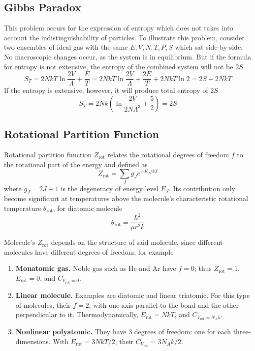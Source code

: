 \documentclass[../../../Main.tex]{subfiles}
\begin{document}
\subsection*{Gibbs Paradox}

This problem occurs for the expression of entropy which does not takes into account the indistinguishability of particles. To illustrate this problem, consider two ensembles of ideal gas with the same $E,V,N,T,P,S$ which sat side-by-side.  No macroscopic changes occur, as the system is in equilibrium. But if the formula for entropy is not extensive, the entropy of the combined system will not be $2S$
\begin{equation*}
	S_T=2NkT\ln\frac{2V}{\Lambda}+\frac{E}{T}=2NkT\ln\frac{2V}{\Lambda}+\frac{2E}{T}+2NkT\ln2=2S+2NkT
\end{equation*}
If the entropy is extensive, however, it will produce total entropy of $2S$
\begin{equation*}
	S_T=2Nk\left(\ln\frac{2V}{2N\Lambda^3}+\frac{5}{2}\right)=2S
\end{equation*}

\subsection*{Rotational Partition Function}

Rotational partition function $Z_\text{rot}$ relates the rotational degrees of freedom $f$ to the rotational part of the energy and defined as
\begin{equation*}
	Z_\text{rot}=\sum_{J} g_Je^{-E_J/kT}
\end{equation*}
where $g_J=2J+1$ is the degeneracy of energy level $E_J$. Its contribution only become significant at temperatures above the molecule's characteristic rotational temperature $\theta_\text{rot}$, for diatomic molecule
\begin{equation*}
	\theta_\text{rot}=\frac{\hbar^2}{\mu r^2 k}
\end{equation*}

Molecule's $Z_\text{rot}$ depends on the structure of said molecule, since different molecules have different degrees of freedom; for example
\begin{enumerate}
	\item \textbf{Monatomic gas.} Noble gas such as He and Ar have $f=0$; thus $Z_\text{rot}=1$, $E_\text{rot}=0$, and $C_{V_\text{rot}=0}$.
	\item \textbf{Linear molecule.} Examples are diatomic and linear triatomic. For this type of molecules, their $f=2$, with one axis parallel to the bond and the other perpendicular to it. Thermodynamically, $E_\text{rot}=NkT$, and $C_{V_\text{rot}=N_Ak}$.
	\item \textbf{Nonlinear polyatomic.} They have 3 degrees of freedom: one for each three-dimensions. With $E_\text{rot}=3NkT/2$, their $C_{V_\text{rot}}=3N_Ak/2$.
\end{enumerate}
\end{document}
